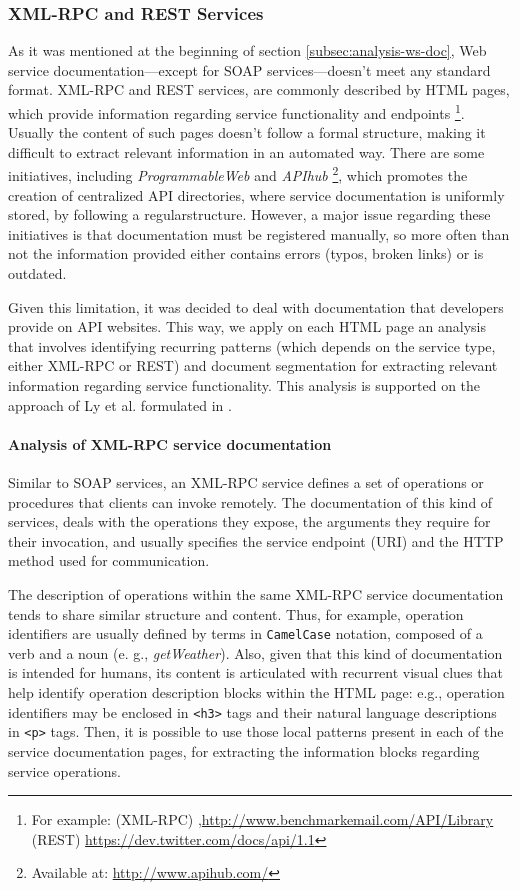 \subsubsection{XML-RPC and REST Services}
\label{subsubsec:rpc-rest}
As it was mentioned at the beginning of section \ref{subsec:analysis-ws-doc}, Web service documentation---except for SOAP services---doesn't meet
any standard format. XML-RPC and REST services, are commonly described by HTML pages, which provide information regarding service functionality and endpoints \footnote{For example: (XML-RPC) ,\href{http://www.benchmarkemail.com/API/Library}{http://www.benchmarkemail.com/API/Library} (REST) \href{https://dev.twitter.com/docs/api/1.1}{https://dev.twitter.com/docs/api/1.1}}. Usually the content of such pages doesn't follow a formal structure, making it difficult to extract relevant information in an automated way. There are some initiatives, including \emph{ProgrammableWeb} and
\emph{APIhub} \footnote{Available at: \href{http://www.apihub.com/}{http://www.apihub.com/}}, which promotes the creation of centralized API directories, where service documentation is uniformly stored, by following a regularstructure. However, a major issue regarding these initiatives is that documentation must be registered manually, so more often than not the information provided either contains errors (typos, broken links) or is outdated.

Given this limitation, it was decided to deal with documentation that developers provide on API websites. This way, we apply on each HTML page an analysis that involves identifying recurring patterns (which depends on the service type, either XML-RPC or REST) and document segmentation for extracting relevant information regarding service functionality. This analysis is supported on the approach of Ly et al. formulated in \cite{Ly:2012}.

\paragraph{Analysis of XML-RPC service documentation}
\label{parag:rpc}
Similar to SOAP services, an XML-RPC service defines a set of operations or procedures that clients can invoke remotely. The documentation of this kind of services, deals with the operations they expose, the arguments they require for their invocation, and usually specifies the service endpoint (URI) and the HTTP method used for communication.

The description of operations within the same XML-RPC service documentation tends to share similar structure and content. Thus, for example, operation identifiers are usually defined by terms in \texttt{CamelCase} notation, composed of a verb and a noun (e. g., \emph{getWeather}). Also, given that this kind of documentation is intended for humans, its content is articulated with recurrent visual clues that help identify operation description blocks within the HTML page: e.g., operation identifiers may be enclosed in \texttt{<h3>} tags and their natural language descriptions\emph{ }in \texttt{<p>} tags. Then, it is possible to use those local patterns present in each of the service documentation pages, for extracting the information blocks regarding service operations. 

